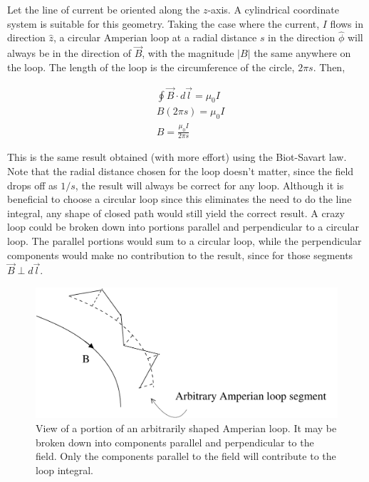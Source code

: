 \documentclass[12pt]{article}
\begin{document}
\begin{flushleft}
Let the line of current be oriented along the $z$-axis.  A cylindrical coordinate system is suitable for this geometry.  Taking the case where the current, $I$ flows in direction $\hat{z}$, a circular Amperian loop at a radial distance $s$ in the direction $\hat{\phi}$ will always be in the direction of $\vec{B}$, with the magnitude $|B|$ the same anywhere on the loop.  The length of the loop is the circumference of the circle, $2\pi s$.  Then,

\begin{equation*}
\begin{aligned}
& \oint \vec{B} \cdot d\vec{l} = \mu_{0} I \\
&  B(2\pi s) = \mu_{0} I \\
& B = \frac{\mu_{0} I}{2\pi s}
\end{aligned}
\end{equation*}

This is the same result obtained (with more effort) using the Biot-Savart law.  Note that the radial distance chosen for the loop doesn't matter, since the field drops off as $1/s$, the result will always be correct for any loop.  Although it is beneficial to choose a circular loop since this eliminates the need to do the line integral, any shape of closed path would still yield the correct result.  A crazy loop could be broken down into portions parallel and perpendicular to a circular loop.  The parallel portions would sum to a circular loop, while the perpendicular components would make no contribution to the result, since for those segments $\vec{B} \perp d\vec{l}$. 
\vspace{.2in}

\begin{figure}[h]
\centering
\includegraphics*[trim=0cm 0cm 0cm 0cm, clip=true, width=0.6\columnwidth]{jaggedloop.pdf}
\caption{\small View of a portion of an arbitrarily shaped Amperian loop.  It may be broken down into components parallel and perpendicular to the field.  Only the components parallel to the field will contribute to the loop integral.}
\label{fig:wiresheet}
\end{figure}


\end{flushleft}
\end{document}

